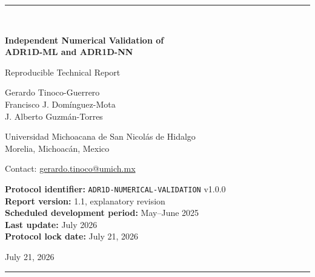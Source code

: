 \documentclass[11pt,a4paper]{article}
\newcommand{\code}[1]{\texttt{#1}}
\begin{document}
\begin{titlepage}
\centering
\vspace*{2.2cm}
{\color{adrblue}\rule{\textwidth}{1.2pt}}\\[1.1cm]
{\Huge\bfseries Independent Numerical Validation of\\[0.25cm]
ADR1D-ML and ADR1D-NN\par}
\vspace{0.65cm}
{\Large Reproducible Technical Report\par}
\vspace{1.1cm}
{\large
Gerardo Tinoco-Guerrero\\[0.15cm]
Francisco J. Domínguez-Mota\\[0.15cm]
J. Alberto Guzmán-Torres\par}
\vspace{0.65cm}
{\normalsize
Universidad Michoacana de San Nicolás de Hidalgo\\
Morelia, Michoacán, Mexico\par}
\vspace{0.25cm}
{\normalsize Contact: \href{mailto:gerardo.tinoco@umich.mx}{gerardo.tinoco@umich.mx}\par}
\vfill
\begin{minipage}{0.88\textwidth}
\small
\textbf{Protocol identifier:} \code{ADR1D-NUMERICAL-VALIDATION} v1.0.0\\
\textbf{Report version:} 1.1, explanatory revision\\
\textbf{Scheduled development period:} May--June 2025\\
\textbf{Last update:} July 2026\\
\textbf{Protocol lock date:} July 21, 2026
\end{minipage}
\vfill
{\normalsize July 21, 2026\par}
\vspace{0.5cm}
{\color{adrblue}\rule{\textwidth}{1.2pt}}
\end{titlepage}
\end{document}
